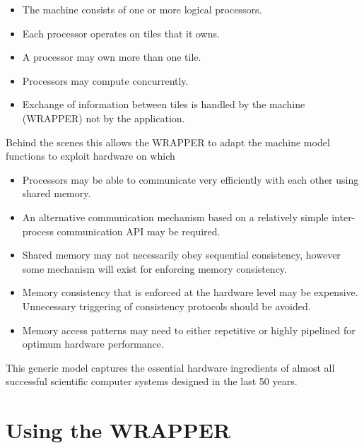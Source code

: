 \begin{itemize}
\item The machine consists of one or more logical processors. \vspace{-3mm}
\item Each processor operates on tiles that it owns.\vspace{-3mm}
\item A processor may own more than one tile.\vspace{-3mm}
\item Processors may compute concurrently.\vspace{-3mm}
\item Exchange of information between tiles is handled by the
machine (WRAPPER) not by the application.
\end{itemize}
Behind the scenes this allows the WRAPPER to adapt the machine model
functions to exploit hardware on which
\begin{itemize}
\item Processors may be able to communicate very efficiently with each other 
using shared memory. \vspace{-3mm}
\item An alternative communication mechanism based on a relatively
simple inter-process communication API may be required.\vspace{-3mm}
\item Shared memory may not necessarily obey sequential consistency,
however some mechanism will exist for enforcing memory consistency. 
\vspace{-3mm}
\item Memory consistency that is enforced at the hardware level
may be expensive. Unnecessary triggering of consistency protocols
should be avoided. \vspace{-3mm}
\item Memory access patterns may need to either repetitive or highly
pipelined for optimum hardware performance. \vspace{-3mm}
\end{itemize}

This generic model captures the essential hardware ingredients
of almost all successful scientific computer systems designed in the
last 50 years.

\section{Using the WRAPPER}

